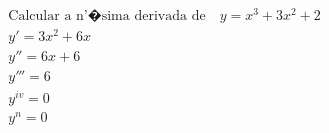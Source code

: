 \begin{ex}
\begin{align}
&\text{Calcular a n'�sima derivada de}\quad y=x^3+3x^2+2\nonumber\\
&y'=3x^2+6x\nonumber\\
&y''=6x+6\nonumber\\
&y'''=6\nonumber\\
&y^{iv}=0\nonumber\\
&y^{n}=0\nonumber
\end{align}
\end{ex}